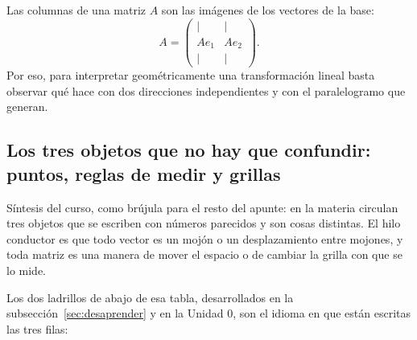 \begin{resultado}
Las columnas de una matriz \(A\) son las imágenes de los vectores de la base:
\[
  A=
  \begin{pmatrix}\vert&\vert\\Ae_1&Ae_2\\\vert&\vert\end{pmatrix}.
\]
Por eso, para interpretar geométricamente una transformación lineal basta observar qué hace
con dos direcciones independientes y con el paralelogramo que generan.
\end{resultado}


\subsection{Los tres objetos que no hay que confundir: puntos, reglas de medir y grillas}\label{sec:puntos-formas-grillas}

{\small\vspace{1mm}\par}

Síntesis del curso, como brújula para el resto del apunte: en la materia circulan tres objetos
que se escriben con números parecidos y son cosas distintas. El hilo conductor es que
todo vector es un mojón o un desplazamiento entre mojones, y toda matriz es una manera de
mover el espacio o de cambiar la grilla con que se lo mide.

Los dos ladrillos de abajo de esa tabla, desarrollados en la subsección~\ref{sec:desaprender}
y en la Unidad 0, son el idioma en que están escritas las tres filas:

